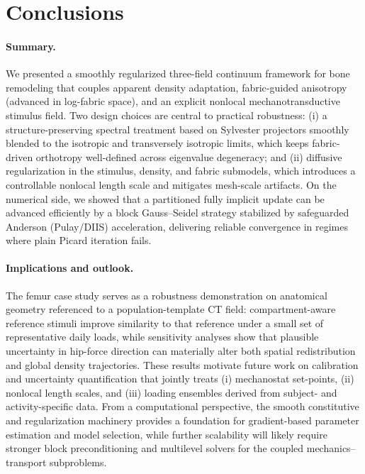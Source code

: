 \section*{Conclusions}
\label{sec:conclusions}

\paragraph{Summary.}
We presented a smoothly regularized three-field continuum framework for bone remodeling that couples apparent density adaptation, fabric-guided anisotropy (advanced in log-fabric space), and an explicit nonlocal mechanotransductive stimulus field.
Two design choices are central to practical robustness: (i) a structure-preserving spectral treatment based on Sylvester projectors smoothly blended to the isotropic and transversely isotropic limits, which keeps fabric-driven orthotropy well-defined across eigenvalue degeneracy; and (ii) diffusive regularization in the stimulus, density, and fabric submodels, which introduces a controllable nonlocal length scale and mitigates mesh-scale artifacts.
On the numerical side, we showed that a partitioned fully implicit update can be advanced efficiently by a block Gauss--Seidel strategy stabilized by safeguarded Anderson (Pulay/DIIS) acceleration, delivering reliable convergence in regimes where plain Picard iteration fails.

\paragraph{Implications and outlook.}
The femur case study serves as a robustness demonstration on anatomical geometry referenced to a population-template CT field: compartment-aware reference stimuli improve similarity to that reference under a small set of representative daily loads, while sensitivity analyses show that plausible uncertainty in hip-force direction can materially alter both spatial redistribution and global density trajectories.
These results motivate future work on calibration and uncertainty quantification that jointly treats (i) mechanostat set-points, (ii) nonlocal length scales, and (iii) loading ensembles derived from subject- and activity-specific data.
From a computational perspective, the smooth constitutive and regularization machinery provides a foundation for gradient-based parameter estimation and model selection, while further scalability will likely require stronger block preconditioning and multilevel solvers for the coupled mechanics--transport subproblems.
